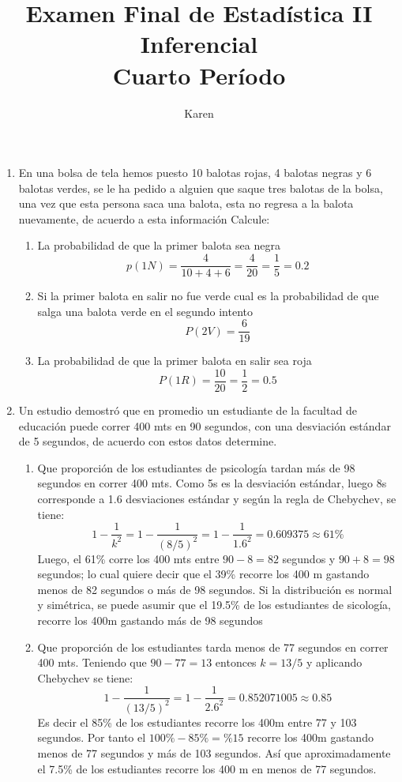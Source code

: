 \documentclass[10pt,a4paper]{article}
\author{Karen}
\title{Examen Final de Estadística II Inferencial\\
Cuarto Período}
\begin{document}
\maketitle
\begin{enumerate}
\item En una bolsa de tela hemos puesto 10 balotas rojas, 4 balotas negras y 6 balotas verdes, se le ha pedido a alguien que saque tres balotas de la bolsa, una vez que esta persona saca una balota, esta no regresa a la balota nuevamente, de acuerdo a esta información Calcule:
\begin{enumerate}
\item La probabilidad de que la primer balota sea negra
\[p(1N)=\dfrac{4}{10+4+6}=\dfrac{4}{20}=\dfrac{1}{5}=0.2\]
\item Si la primer balota en salir no fue verde cual es la probabilidad de que salga una balota verde en el segundo intento
\[P(2V)=\dfrac{6}{19}\]
\item La probabilidad de que la primer balota en salir sea roja
\[P(1R)=\dfrac{10}{20}=\dfrac{1}{2}=0.5\]
\end{enumerate}
\item Un estudio demostró que en promedio un estudiante de la facultad de educación puede correr 400 mts en 90 segundos, con una desviación estándar de 5 segundos, de acuerdo con estos datos determine.
\begin{enumerate}
\item Que proporción de los estudiantes de psicología tardan más de 98 segundos en correr 400 mts. Como 5s es la desviación estándar, luego 8s corresponde a 1.6 desviaciones estándar y según la regla de Chebychev, se tiene:
\[1-\dfrac{1}{k^{2}}=1-\dfrac{1}{(8/5)^{2}}=1-\dfrac{1}{1.6^{2}}=0.609375\approx 61\%\]
Luego, el 61\% corre los 400 mts entre $90-8=82$ segundos y $90+8=98$ segundos; lo cual quiere decir que el 39\% recorre los 400 m gastando menos de 82 segundos o más de 98 segundos. Si la distribución es normal y simétrica, se puede asumir que el 19.5\% de los estudiantes de sicología, recorre los 400m gastando más de 98 segundos
\item Que proporción de los estudiantes tarda menos de 77 segundos en correr 400 mts. Teniendo que $90-77=13$ entonces $k=13/5$ y aplicando Chebychev se tiene:
\[1-\dfrac{1}{(13/5)^{2}}=1-\dfrac{1}{2.6^{2}}=0.852071005\approx 0.85 \]
Es decir el 85\% de los estudiantes recorre los 400m entre 77 y 103 segundos. Por tanto el $100\%-85\%=\%15$ recorre los 400m gastando menos de 77 segundos y más de 103 segundos. Así que aproximadamente el 7.5\% de los estudiantes recorre los 400 m en menos de 77 segundos.
\end{enumerate}
\end{enumerate}
\end{document}
